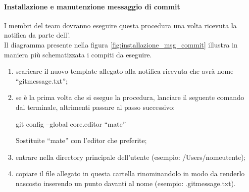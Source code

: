 			\paragraph{Installazione e manutenzione messaggio di commit}
			\label{sec:installazione_msg_commit}
			I membri del team dovranno eseguire questa procedura una volta ricevuta la notifica da parte dell'\roleAdministrator. \\
			Il diagramma presente nella figura \ref{fig:installazione_msg_commit} illustra in maniera più schematizzata i compiti da eseguire.
				\begin{enumerate}
					\item scaricare il nuovo template\gloss{} allegato alla notifica ricevuta che avrà nome ``gitmessage.txt'';
					\item se è la prima volta che si esegue la procedura, lanciare il seguente comando dal terminale, altrimenti passare al passo successivo:
						\begin{center}
							git\gloss{} config --global core.editor ``mate''
						\end{center}
					\noindent
					Sostituite ``mate'' con l'editor che preferite;
					\item entrare nella directory principale dell'utente (esempio: /Users/nomeutente);
					\item copiare il file allegato in questa cartella rinominandolo in modo da renderlo nascosto inserendo un punto davanti al nome (esempio: .gitmessage.txt).
				\end{enumerate}
				
